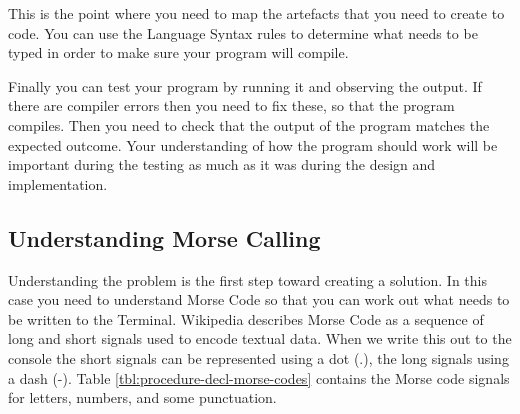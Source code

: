 This is the point where you need to map the artefacts that you need to create to code. You can use the Language Syntax rules to determine what needs to be typed in order to make sure your program will compile.

Finally you can test your program by running it and observing the output. If there are compiler errors then you need to fix these, so that the program compiles. Then you need to check that the output of the program matches the expected outcome. Your understanding of how the program should work will be important during the testing as much as it was during the design and implementation.

\clearpage
\subsection{Understanding Morse Calling} %
\label{ssub:understanding_morse_calling}

Understanding the problem is the first step toward creating a solution. In this case you need to understand Morse Code so that you can work out what needs to be written to the Terminal. Wikipedia describes Morse Code as a sequence of long and short signals used to encode textual data. When we write this out to the console the short signals can be represented using a dot (.), the long signals using a dash (-). Table \ref{tbl:procedure-decl-morse-codes} contains the Morse code signals for letters, numbers, and some punctuation.

